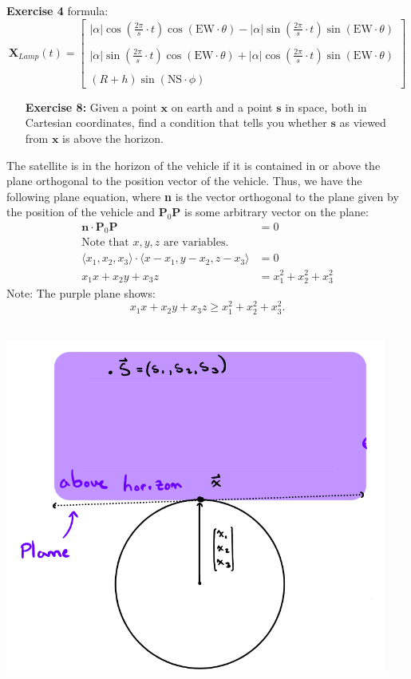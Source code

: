 \documentclass[11pt]{article}
\theoremstyle{definition}
\newcommand{\1}[1]{\mathbf{1} \left \{ #1 \right \}}
\begin{document}
\textbf{Exercise 4} formula:
\[\textbf{X}_{Lamp}(t) = \begin{bmatrix}
|\alpha| \cos \left(\frac{2\pi}{s} \cdot t\right) \cos (\textrm{EW} \cdot \theta) - |\alpha| \sin \left(\frac{2\pi}{s} \cdot t\right) \sin (\textrm{EW} \cdot \theta) \\ \\
|\alpha| \sin \left(\frac{2\pi}{s} \cdot t\right) \cos (\textrm{EW} \cdot \theta) + |\alpha| \cos \left(\frac{2\pi}{s} \cdot t\right) \sin (\textrm{EW} \cdot \theta) \\ \\
(R + h) \sin (\textrm{NS} \cdot \phi)
\end{bmatrix}\]

\pagebreak
\begin{itemize}
\item[{\textbf{Exercise 8:}}] Given a point $\textbf{x}$ on earth and a point $\textbf{s}$ in space, both in Cartesian coordinates, find a condition that tells you whether $\textbf{s}$ as viewed from $\textbf{x}$ is above the horizon.
\end{itemize}
\begin{minipage}{0.6\linewidth}
The satellite is in the horizon of the vehicle if it is contained in or above the plane orthogonal to the position vector of the vehicle.  Thus, we have the following plane equation, where \textbf{n} is the vector orthogonal to the plane given by the position of the vehicle and \textbf{P$_0$P} is some arbitrary vector on the plane:
\begin{align*}
    \textbf{n} \cdot \textbf{P$_0$P} &= 0 \\
    \text{Note that $x, y, z$ are variables.} \\
    \langle x_1, x_2, x_3 \rangle \cdot \langle x-x_1, y-x_2, z-x_3 \rangle &= 0 \\
    x_1x + x_2y + x_3z &= x_1^2 + x_2^2 + x_3^2
\end{align*}
Note: The purple plane shows:
\[x_1x + x_2y + x_3z \geq x_1^2 + x_2^2 + x_3^2.\]
\\
\end{minipage}
\begin{minipage}{0.4\linewidth}
\includegraphics[width=0.3\textheight]{Images/M5600_6.PNG}
\end{minipage}
\end{document}

